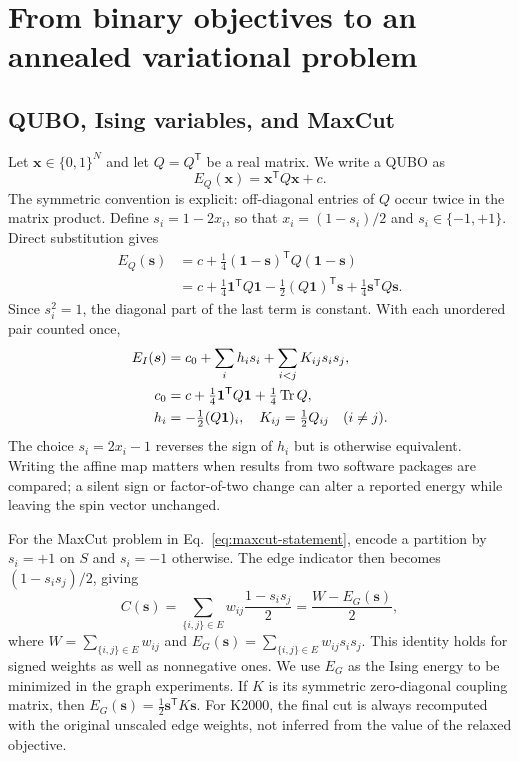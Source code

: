 \section{From binary objectives to an annealed variational problem}
\label{sec:formulation}

\subsection{QUBO, Ising variables, and MaxCut}

Let $\bm x\in\{0,1\}^{N}$ and let $Q=Q^{\mathsf T}$ be a real matrix. We
write a QUBO as
\begin{equation}
 E_Q(\bm x)=\bm x^{\mathsf T}Q\bm x+c.
 \label{eq:qubo}
\end{equation}
The symmetric convention is explicit: off-diagonal entries of $Q$ occur
twice in the matrix product. Define $s_i=1-2x_i$, so that
$x_i=(1-s_i)/2$ and $s_i\in\{-1,+1\}$. Direct substitution gives
\begin{align}
 E_Q(\bm s)
 &=c+\frac14(\bm 1-\bm s)^{\mathsf T}
                 Q(\bm 1-\bm s)\nonumber\\
 &=c+\frac14\bm 1^{\mathsf T}Q\bm 1
   -\frac12(Q\bm 1)^{\mathsf T}\bm s
   +\frac14\bm s^{\mathsf T}Q\bm s.
 \label{eq:qubo-expand}
\end{align}
Since $s_i^2=1$, the diagonal part of the last term is constant. With
each unordered pair counted once,
\begin{align}
 E_I(\bm s)&=c_0+\sum_i h_i s_i+\sum_{i<j}K_{ij}s_i s_j,
 \label{eq:ising-energy}\\
 c_0&=c+\tfrac14\bm 1^{\mathsf T}Q\bm 1+\tfrac14\operatorname{Tr} Q,
 \nonumber\\
 h_i&=-\tfrac12(Q\bm 1)_i,
 \quad K_{ij}=\tfrac12Q_{ij}\quad(i\ne j).
 \label{eq:qubo-map}
\end{align}
The choice $s_i=2x_i-1$ reverses the sign of $h_i$ but is otherwise
equivalent. Writing the affine map matters when results from two software
packages are compared; a silent sign or factor-of-two change can alter a
reported energy while leaving the spin vector unchanged.

For the MaxCut problem in Eq.~\eqref{eq:maxcut-statement}, encode a
partition by $s_i=+1$ on $S$ and $s_i=-1$ otherwise. The edge indicator
then becomes $(1-s_i s_j)/2$, giving
\begin{equation}
 C(\bm s)=\sum_{\{i,j\}\in E}w_{ij}\frac{1-s_i s_j}{2}
 =\frac{W-E_G(\bm s)}{2},
 \label{eq:cut}
\end{equation}
where $W=\sum_{\{i,j\}\in E}w_{ij}$ and
$E_G(\bm s)=\sum_{\{i,j\}\in E}w_{ij}s_i s_j$.
This identity holds for signed weights as well as nonnegative ones. We
use $E_G$ as the Ising energy to be minimized in the graph experiments.
If $K$ is its symmetric zero-diagonal coupling matrix, then
$E_G(\bm s)=\tfrac12\bm s^{\mathsf T}K\bm s$.
For K2000, the final cut is always recomputed with the original unscaled
edge weights, not inferred from the value of the relaxed objective.

